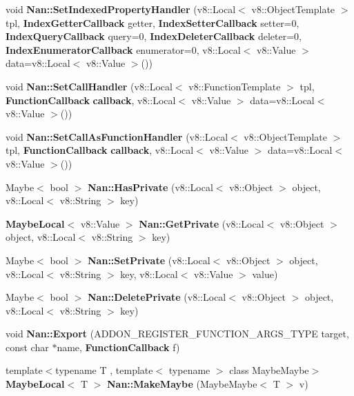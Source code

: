 \begin{DoxyCompactItemize}
\item 
void \textbf{ Nan\+::\+Set\+Indexed\+Property\+Handler} (v8\+::\+Local$<$ v8\+::\+Object\+Template $>$ tpl, \textbf{ Index\+Getter\+Callback} getter, \textbf{ Index\+Setter\+Callback} setter=0, \textbf{ Index\+Query\+Callback} query=0, \textbf{ Index\+Deleter\+Callback} deleter=0, \textbf{ Index\+Enumerator\+Callback} enumerator=0, v8\+::\+Local$<$ v8\+::\+Value $>$ data=v8\+::\+Local$<$ v8\+::\+Value $>$())
\item 
void \textbf{ Nan\+::\+Set\+Call\+Handler} (v8\+::\+Local$<$ v8\+::\+Function\+Template $>$ tpl, \textbf{ Function\+Callback} \textbf{ callback}, v8\+::\+Local$<$ v8\+::\+Value $>$ data=v8\+::\+Local$<$ v8\+::\+Value $>$())
\item 
void \textbf{ Nan\+::\+Set\+Call\+As\+Function\+Handler} (v8\+::\+Local$<$ v8\+::\+Object\+Template $>$ tpl, \textbf{ Function\+Callback} \textbf{ callback}, v8\+::\+Local$<$ v8\+::\+Value $>$ data=v8\+::\+Local$<$ v8\+::\+Value $>$())
\item 
Maybe$<$ bool $>$ \textbf{ Nan\+::\+Has\+Private} (v8\+::\+Local$<$ v8\+::\+Object $>$ object, v8\+::\+Local$<$ v8\+::\+String $>$ key)
\item 
\textbf{ Maybe\+Local}$<$ v8\+::\+Value $>$ \textbf{ Nan\+::\+Get\+Private} (v8\+::\+Local$<$ v8\+::\+Object $>$ object, v8\+::\+Local$<$ v8\+::\+String $>$ key)
\item 
Maybe$<$ bool $>$ \textbf{ Nan\+::\+Set\+Private} (v8\+::\+Local$<$ v8\+::\+Object $>$ object, v8\+::\+Local$<$ v8\+::\+String $>$ key, v8\+::\+Local$<$ v8\+::\+Value $>$ value)
\item 
Maybe$<$ bool $>$ \textbf{ Nan\+::\+Delete\+Private} (v8\+::\+Local$<$ v8\+::\+Object $>$ object, v8\+::\+Local$<$ v8\+::\+String $>$ key)
\item 
void \textbf{ Nan\+::\+Export} (A\+D\+D\+O\+N\+\_\+\+R\+E\+G\+I\+S\+T\+E\+R\+\_\+\+F\+U\+N\+C\+T\+I\+O\+N\+\_\+\+A\+R\+G\+S\+\_\+\+T\+Y\+PE target, const char $\ast$name, \textbf{ Function\+Callback} f)
\item 
{\footnotesize template$<$typename T , template$<$ typename $>$ class Maybe\+Maybe$>$ }\\\textbf{ Maybe\+Local}$<$ T $>$ \textbf{ Nan\+::\+Make\+Maybe} (Maybe\+Maybe$<$ T $>$ v)
\end{DoxyCompactItemize}
